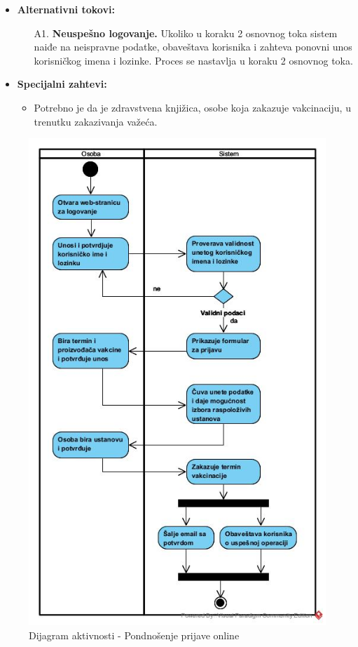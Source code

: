 \documentclass[titlepage]{article}
\begin{document}
\begin{itemize}
    \item \textbf{Alternativni tokovi:}
        \begin{itemize}
            \item[A1.] \textbf{Neuspešno logovanje.} Ukoliko u koraku 2 osnovnog toka sistem naiđe na neispravne podatke, obaveštava korisnika i zahteva ponovni unos korisničkog imena i lozinke. Proces se nastavlja u koraku 2 osnovnog toka.
        \end{itemize}
    
    \item \textbf{Specijalni zahtevi:}
		\begin{itemize}
			\item Potrebno je da je zdravstvena knjižica, osobe koja zakazuje vakcinaciju, u trenutku zakazivanja važeća.
		\end{itemize}
  
\end{itemize}

\begin{figure}[H]
\centering
\includegraphics[scale=0.7]{Podnosenje_prijave_online}
\caption{Dijagram aktivnosti - Pondnošenje prijave online}
\end{figure}
\end{document}
